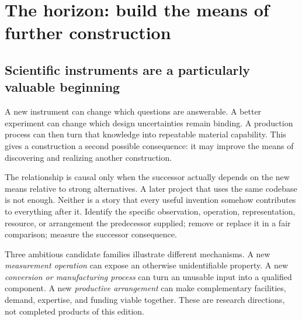 \section{The horizon: build the means of further construction}
\label{sec:horizon}

\subsection{Scientific instruments are a particularly valuable beginning}

A new instrument can change which questions are answerable. A better experiment can change which design uncertainties remain binding. A production process can then turn that knowledge into repeatable material capability. This gives a construction a second possible consequence: it may improve the means of discovering and realizing another construction.

The relationship is causal only when the successor actually depends on the new means relative to strong alternatives. A later project that uses the same codebase is not enough. Neither is a story that every useful invention somehow contributes to everything after it. Identify the specific observation, operation, representation, resource, or arrangement the predecessor supplied; remove or replace it in a fair comparison; measure the successor consequence.

Three ambitious candidate families illustrate different mechanisms. A new \emph{measurement operation} can expose an otherwise unidentifiable property. A new \emph{conversion or manufacturing process} can turn an unusable input into a qualified component. A new \emph{productive arrangement} can make complementary facilities, demand, expertise, and funding viable together. These are research directions, not completed products of this edition.

